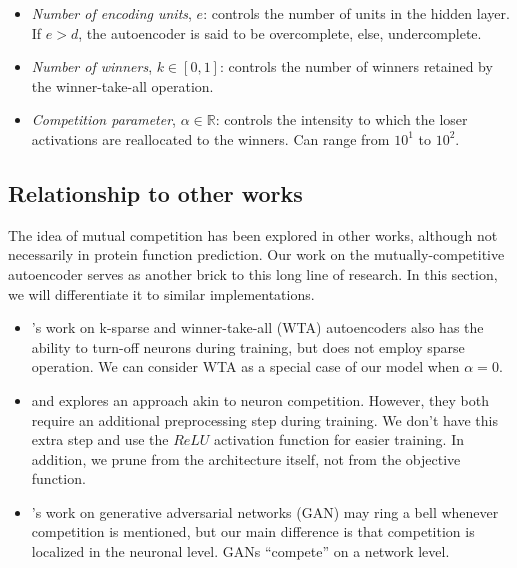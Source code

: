 \begin{itemize}
  \item \textit{Number of encoding units}, $e$: controls the number of units
  in the hidden layer. If $e > d$, the autoencoder is said to be
  overcomplete, else, undercomplete.
  \item \textit{Number of winners}, $k \in \left[0,1\right]$: controls the
  number of winners retained by the winner-take-all operation.
  \item \textit{Competition parameter}, $\alpha \in \mathbb{R}$: controls the
  intensity to which the loser activations are reallocated to the winners.
  Can range from $10^{1}$ to $10^{2}$.
\end{itemize}

\vspace*{-10pt}


\subsection{Relationship to other works}
\par The idea of mutual competition has been explored in other works, although
not necessarily in protein function prediction. Our work on the
mutually-competitive autoencoder serves as another brick to this long line of
research. In this section, we will differentiate it to similar implementations.
\begin{itemize}
    \item \cite{makhzani2014ksparse}'s work on k-sparse and winner-take-all
        (WTA) autoencoders also has the ability to turn-off neurons during
        training, but does not employ sparse operation. We can consider WTA as
        a special case of our model when $\alpha=0$.
    \item \cite{zhai2016semisupervised,louizos2017learning} and
        \cite{chen2017kate} explores an approach akin to
        neuron competition. However, they both require an additional
        preprocessing step during training. We don't have this extra step and
        use the $ReLU$ activation function for easier training. In addition, we
        prune from the architecture itself, not from the objective function.
    \item \cite{goodfellow2014generative}'s work on generative adversarial
        networks (GAN) may ring a bell whenever competition is mentioned, but
        our main difference is that competition is localized in the neuronal
        level. GANs ``compete'' on a network level.
\end{itemize}

